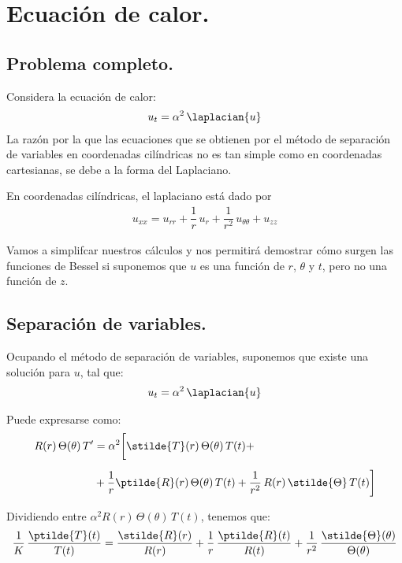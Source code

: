 \section{Ecuación de calor.}
\subsection{Problema completo.}
Considera la ecuación de calor:
\begin{align*}
u_{t} =  \alpha^{2} \,  \laplacian{u}
\end{align*}
La razón por la que las ecuaciones que se obtienen por el método de separación de variables en coordenadas cilíndricas no es tan simple como en coordenadas cartesianas, se debe a la forma del Laplaciano. 

En coordenadas cilíndricas, el laplaciano está dado por
\begin{align*}
u_{xx} = u_{rr} + \dfrac{1}{r} \, u_{r} + \dfrac{1}{r^{2}} \, u_{\theta \theta} + u_{zz}
\end{align*}

Vamos a simplifcar nuestros cálculos y nos permitirá demostrar cómo surgen las funciones de Bessel si suponemos que $u$ es una función de $r$, $\theta$ y $t$, pero no una función de $z$.

\subsection{Separación de variables.}

Ocupando el método de separación de variables, suponemos que existe una solución para $u$, tal que:
\begin{align*}
u_{t} = \alpha^{2} \, \laplacian{u}
\end{align*}

Puede expresarse como:
\begin{align*}
R(r) \, \Theta (\theta) \, T^{\prime} &= \alpha^{2} \bigg[ \stilde{T} (r) \, \Theta (\theta) \, T(t) + \\[0.5em]
&+ \dfrac{1}{r} \ptilde{R} (r) \, \Theta(\theta) \, T(t) + \dfrac{1}{r^{2}} \, R(r) \, \stilde{\Theta} \, T(t) \bigg]
\end{align*}

Dividiendo entre $\alpha^{2} R(r) \, \Theta (\theta) \, T(t)$, tenemos que:
\begin{align}
\dfrac{1}{K} \, \dfrac{\ptilde{T} (t)}{T (t)} = \dfrac{\stilde{R} (r)}{R (r)} + \dfrac{1}{r} \, \dfrac{\ptilde{R} (t)}{R (t)} + \dfrac{1}{r^{2}} \, \dfrac{\stilde{\Theta} (\theta)}{\Theta (\theta)}
\label{eq:ecuacion_K01}
\end{align}

